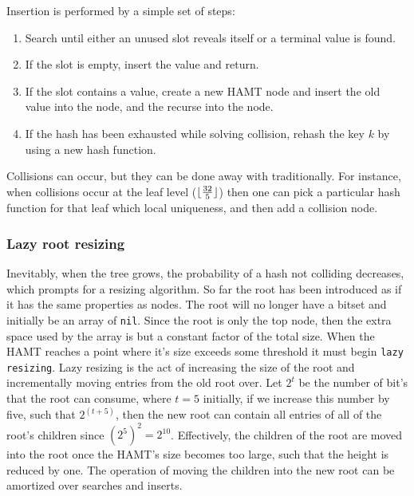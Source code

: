 Insertion is performed by a simple set of steps:
\begin{enumerate}
  \item Search until either an unused slot reveals itself or a terminal value is found.
  \item If the slot is empty, insert the value and return.
  \item If the slot contains a value, create a new HAMT node and insert the old value into the node, and the recurse into the node.
  \item If the hash has been exhausted while solving collision, rehash the key $k$ by using a new hash function.
\end{enumerate}
\begin{remark}
  Collisions can occur, but they can be done away with traditionally.
  For instance, when collisions occur at the leaf level ($\lfloor\frac{32}{5}\rfloor$) then one can pick a particular hash function for that leaf which local uniqueness, and then add a collision node.
\end{remark}

\subsubsection{Lazy root resizing}
Inevitably, when the tree grows, the probability of a hash not colliding decreases, which prompts for a resizing algorithm.
So far the root has been introduced as if it has the same properties as nodes.
The root will no longer have a bitset and initially be an array of \texttt{nil}.
Since the root is only the top node, then the extra space used by the array is but a constant factor of the total size.
When the HAMT reaches a point where it's size exceeds some threshold it must begin \texttt{lazy resizing}.
Lazy resizing is the act of increasing the size of the root and incrementally moving entries from the old root over.
Let $2^t$ be the number of bit's that the root can consume, where $t = 5$ initially, if we increase this number by five, such that $2^(t + 5)$, then the new root can contain all entries of all of the root's children since $(2^5)^2 = 2^{10}$.
Effectively, the children of the root are moved into the root once the HAMT's size becomes too large, such that the height is reduced by one.
The operation of moving the children into the new root can be amortized over searches and inserts.


